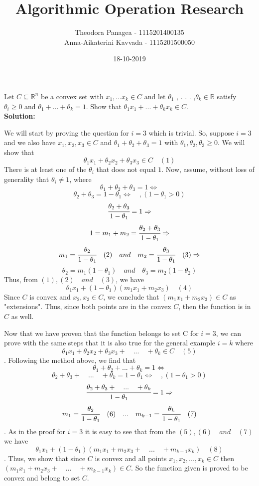 \documentclass[10pt]{article}
\title{Algorithmic Operation Research}
\date{18-10-2019}
\author{Theodora Panagea - 1115201400135 \\ Anna-Aikaterini Kavvada - 1115201500050}
\newcommand{\R}{\mathbb{R}}
\begin{document}
	\maketitle{}
  	
  	\begin{center}
  	\section{}
  	\end{center}\par
  	Let  $C \subseteq \R^n$ be a convex set with $x_1 , . . . x_k \in C$ and let $			\theta_1$ , . . . ,$\theta_k \in \R $
  	satisfy $\theta_i \geq 0$ and $\theta_1 + . . . + \theta_k = 1 $. Show that $\theta_1 x_1 + . . . + \theta_k x_k \in C $.\\
  	\textbf{Solution:}\par
  	We will start by proving the question for $i = 3$ which is trivial. So, suppose $i = 3$  and we also have $x_1, x_2, x_3 \in C$ and $\theta_1 + \theta_2 + \theta_3 = 1$ with $\theta_1, \theta_2, \theta_3 \geq 0$. 
  	  We will show that $$\theta_1 x_1 + \theta_2 x_2 + \theta_3 x_3 \in C\quad (1)$$ 
  	  There is at least one of the $\theta_i$ that does not equal $1$.
  	  Now, assume, without loss of generality that $\theta_i \neq 1$, where $$\theta_1 + \theta_2 + \theta_3 = 1 \iff $$$$\theta_2 + \theta_3 = 1 - \theta_1 \iff\quad,   (1 - \theta_1 > 0)$$ $$\cfrac{\theta_2 + \theta_3}{1-\theta_1} = 1 \Rightarrow$$ $$1 = m_1 + m_2 = \cfrac{\theta_2 + \theta_3}{1-\theta_1} \Rightarrow$$ $$m_1 = \cfrac{\theta_2}{1-\theta_1}\quad(2)\quad and \quad m_2 = \cfrac{\theta_3}{1-\theta_1}\quad(3)\Rightarrow$$ $$\theta_2 = m_1(1 - \theta_1)\quad and \quad \theta_3 = m_2(1 - \theta_2)$$ 
  	  Thus, from $(1), (2)\quad and\quad (3)$, we have 	$$\theta_1 x_1 + (1 - \theta_1)(m_1 x_1 + m_2 x_3)\quad (4)$$
  	  Since $C$ is convex and $x_2, x_3 \in C$, we conclude that $(m_1 x_1 + m_2 x_3) \in C$ as "extensions". Thus, since both points are in the convex $C$, then the function is in $C$ as well.\par 
  	  \newpage
  	  Now that we have proven that the function belongs to set C for $i = 3$, we can prove with the same steps that it is also true for the general example $i = k$ where $$\theta_1 x_1 + \theta_2 x_2 + \theta_3 x_3 +\quad . . .\quad +\theta_k \in C\quad (5)$$. Following the method above, we find that $$\theta_1 + \theta_2 + ... + \theta_k = 1 \iff$$ $$\theta_2 + \theta_3 +\quad . . .\quad + \theta_k = 1 - \theta_1 \iff \quad,   (1 - \theta_1 > 0)$$ $$\cfrac{\theta_2 + \theta_3 +\quad . . .\quad +\theta_k}{1-\theta_1} = 1 \Rightarrow$$ $$m_1 = \cfrac{\theta_2}{1-\theta_1}\quad (6)\quad . . .\quad m_{k-1} = \cfrac{\theta_k}{1 - \theta_1}\quad (7)$$. As in the proof for $i = 3$ it is easy to see that from the $(5), (6)\quad and\quad (7)$ we have $$\theta_1 x_1 + (1 - \theta_1)(m_1 x_1 + m_2 x_3 +\quad . . .\quad + m_{k-1} x_k)\quad (8)$$. Thus, we show that since $C$ is convex and all points $x_1, x_2, ..., x_k \in C$ then $(m_1 x_1 + m_2 x_3 +\quad . . .\quad + m_{k-1} x_k) \in C$. So the function given is proved to be convex and belong to set $C$.
  	\newpage
  	
\end{document}
